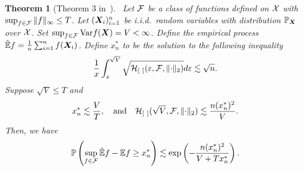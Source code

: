 \documentclass[twoside,11pt]{article}
\theoremstyle{plain}
\newtheorem{thm}{Theorem}
\theoremstyle{definition}
\begin{document}
\begin{thm}[Theorem 3 in~\cite{shen1994convergence}]~\label{thm:refer}Let $\mathcal{F}$ be a class of functions defined on $\mathcal{X}$ with $\sup_{f\in\mathcal{F}}\|f\|_{\infty}\leq T$. Let $(\bm X_i)_{i=1}^n$ be i.i.d.\ random variables with distribution $\mathbb{P}_{\bm X}$ over $\mathcal{X}$. Set $\sup_{f\in\mathcal{F}}\textup{Var}f(\bm X)=V<\infty$. 
Define the empirical process $\mathbb{\hat E}f={1\over n}\sum_{i=1}^n f(\bm X_i)$. 
Define $x_n^*$ to be the solution to the following inequality
\[
{1\over x}\int_x^{\sqrt{V}}\sqrt{\tH_{[\ ]}(\varepsilon,\tF,\vnormSize{}{\cdot})}d\varepsilon \lesssim \sqrt{n}.
\]
Suppose $\sqrt{V}\leq T$ and 
\[
x_n^*\lesssim {V\over T},\quad \text{and}\quad \mathcal{H}_{[\ ]}(\sqrt{V},\mathcal{F},\lVert\cdot\rVert_2)\lesssim {n(x_n^*)^2 \over V}.
\]
Then, we have
\begin{equation}\label{eq:oneside}
\mathbb{P}\left(\sup_{f\in\mathcal{F}}\mathbb{\hat E}f -\mathbb{E}f\geq x^*_n\right)\lesssim  \exp\left(-{n (x^*_n)^2\over V+Tx^*_n}\right). 
\end{equation}
\end{thm}
\end{document}
